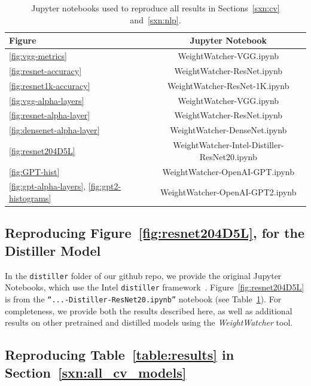 \begin{table}[t]
\small
\begin{center}
\begin{tabular}{|p{1in}|c|}
\hline
Figure & Jupyter Notebook \\
\hline
\ref{fig:vgg-metrics}                                 & WeightWatcher-VGG.ipynb \\
\ref{fig:resnet-accuracy}                             & WeightWatcher-ResNet.ipynb \\
\ref{fig:resnet1k-accuracy}                           & WeightWatcher-ResNet-1K.ipynb \\
\ref{fig:vgg-alpha-layers}                            & WeightWatcher-VGG.ipynb \\
\ref{fig:resnet-alpha-layer}                          & WeightWatcher-ResNet.ipynb \\
\ref{fig:densenet-alpha-layer}                        & WeightWatcher-DenseNet.ipynb \\
\hline
\ref{fig:resnet204D5L}                                & WeightWatcher-Intel-Distiller-ResNet20.ipynb \\
\hline
\ref{fig:GPT-hist}                                    & WeightWatcher-OpenAI-GPT.ipynb \\
\ref{fig:gpt-alpha-layers}, \ref{fig:gpt2-histograms} & WeightWatcher-OpenAI-GPT2.ipynb \\
\hline
\end{tabular}
\end{center}
\caption{Jupyter notebooks used to reproduce all results in Sections~\ref{sxn:cv} and~\ref{sxn:nlp}.}
\label{table:notebooks}
\end{table}


\subsection{Reproducing Figure~\ref{fig:resnet204D5L}, for the Distiller Model}

In the \texttt{distiller} folder of our github repo, 
we provide the original Jupyter Notebooks, which use the Intel \texttt{distiller} framework~\cite{distiller}.   
Figure~\ref{fig:resnet204D5L} is from the  \texttt{``...-Distiller-ResNet20.ipynb''} notebook (see Table~\ref{table:notebooks}).  
For completeness, we provide both the results described here, as well as additional results on other pretrained and distilled models using the \emph{WeightWatcher} tool.


\subsection{Reproducing Table~\ref{table:results} in Section~\ref{sxn:all_cv_models} }

